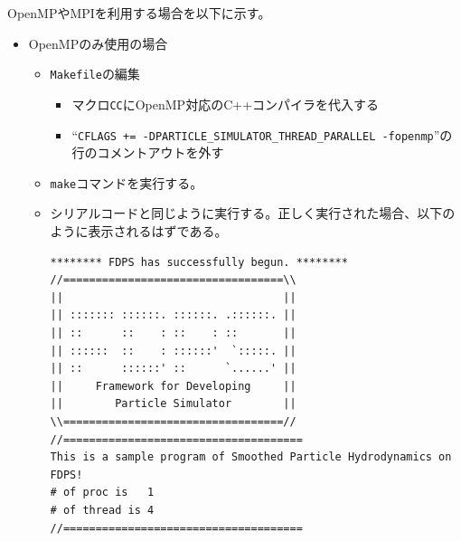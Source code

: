 \documentclass[12pt,a4paper,dvipdfmx]{jarticle}
\begin{document}
OpenMPやMPIを利用する場合を以下に示す。
\begin{itemize}
\item OpenMPのみ使用の場合
  \begin{itemize}
  \item \texttt{Makefile}の編集
    \begin{itemize}
    \item マクロ\texttt{CC}にOpenMP対応のC++コンパイラを代入する
    \item ``\texttt{CFLAGS += -DPARTICLE\_SIMULATOR\_THREAD\_PARALLEL -fopenmp}''の
      行のコメントアウトを外す
    \end{itemize}
  \item \texttt{make}コマンドを実行する。
  \item シリアルコードと同じように実行する。正しく実行された場合、以下のように表示されるはずである。
\begin{screen}
\begin{verbatim}
******** FDPS has successfully begun. ********
//==================================\\
||                                  ||
|| ::::::: ::::::. ::::::. .::::::. ||
|| ::      ::    : ::    : ::       ||
|| ::::::  ::    : ::::::'  `:::::. ||
|| ::      ::::::' ::      `......' ||
||     Framework for Developing     ||
||        Particle Simulator        ||
\\==================================//
//=====================================
This is a sample program of Smoothed Particle Hydrodynamics on FDPS!
# of proc is   1
# of thread is 4
//=====================================
\end{verbatim}
\end{screen}
  \end{itemize}


\end{itemize}
\end{document}
